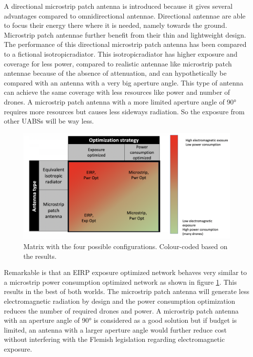 \documentclass[twocolumn]{phdsymp} %
\begin{document}
A directional microstrip patch antenna is introduced because it gives several advantages compared to omnidirectional antennae.
Directional antennae are able to focus their energy there where it is needed, namely towards the ground. Microstrip patch antennae 
further benefit from their thin and lightweight design. The performance 
of this directional microstrip patch antenna has been compared to a 
fictional \gls{isotropicradiator}.
This \gls{isotropicradiator} has higher exposure and coverage for less power, compared to realistic antennae like microstrip patch antennae
because of the absence of attenuation, and can hypothetically be compared with an antenna with a very big aperture angle.
This type of antenna can achieve the same coverage with less
resources like power and number of drones. 
A microstrip patch antenna with a more limited aperture angle of \ang{90} requires more resources but 
causes less sideways radiation. So the exposure from other \gls{UABS}s will be way less.

\begin{figure}[h!]
  \includegraphics[width=\linewidth]{fourCasesMatrixSol.png}
  \caption{Matrix with the four possible configurations. Colour-coded based on the results.}
  \label{fig:resultIllustration}
\end{figure}

Remarkable is that an \gls{EIRP} exposure optimized network behaves very similar to a microstrip power consumption optimized network as shown 
in figure \ref{fig:resultIllustration}.
This results in the best of both worlds. 
The microstrip patch antenna will generate less electromagnetic radiation by design and
 the power consumption optimization reduces the number of required drones and power. A microstrip patch antenna with an aperture 
 angle of \ang{90} is considered as a good solution but if budget is limited, an antenna with a larger aperture angle 
 would further reduce cost without interfering with the Flemish legislation regarding electromagnetic exposure.
\end{document}
